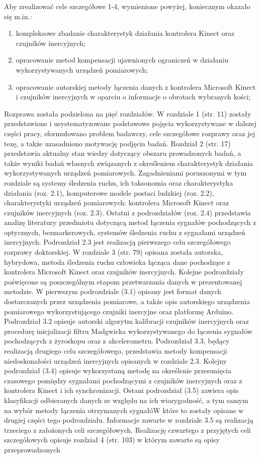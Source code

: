 \documentclass[10pt,a4paper]{article}
\begin{document}
\begin{FlushLeft}
Aby zrealizować cele szczegółowe 1-4, wymienione powyżej, koniecznym okazało się m.in.:
\begin{enumerate}[1. ]
	\item kompleksowe zbadanie charakterystyk działania kontrolera Kinect oraz czujników inercyjnych;
    \item opracowanie metod kompensacji ujawnionych ograniczeń w działaniu wykorzystywanych urządzeń pomiarowych;
	\item opracowanie autorskiej metody łączenia danych z kontrolera Microsoft Kinect i czujników inercyjnych w oparciu o informacje o obrotach wybranych kości;
\end{enumerate}

Rozprawa została podzielona na pięć rozdziałów. W rozdziale 1 (str. 11) zostały przedstawione i usystematyzowane podstawowe pojęcia wykorzystywane w dalszej części pracy, sformułowano problem badawczy, cele szczegółowe rozprawy oraz jej tezę, a także uzasadniono motywację podjęcia badań. Rozdział 2 (str. 17) przedstawia aktualny stan wiedzy dotyczący obszaru prowadzonych badań, a także wyniki badań własnych związanych z określeniem charakterystyk działania wykorzystywanych urządzeń pomiarowych. Zagadnieniami poruszonymi w tym rozdziale są systemy śledzenia ruchu, ich taksonomia oraz charakterystyka działania (roz. 2.1), komputerowe modele postaci ludzkiej (roz. 2.2), charakterystyki urządzeń pomiarowych: kontrolera Microsoft Kinect oraz czujników inercyjnych (roz. 2.3). Ostatni z podrozdziałów (roz. 2.4) przedstawia analizę literatury przedmiotu dotyczącą metod łączenia sygnałów pochodzących z optycznych, bezmarkerowych, systemów śledzenia ruchu z sygnałami urządzeń inercyjnych. Podrozdział 2.3 jest realizacją pierwszego celu szczegółowego rozprawy doktorskiej. W rozdziale 3 (str. 79) opisana została autorska, hybrydowa, metoda śledzenia ruchu człowieka łącząca dane pochodzące z kontrolera Microsoft Kinect oraz czujników inercyjnych. Kolejne podrozdziały poświęcone są poszczególnym etapom przetwarzania danych w prezentowanej metodzie. W pierwszym podrozdziale (3.1) opisany jest format danych dostarczanych przez urządzenia pomiarowe, a także opis autorskiego urządzenia pomiarowego wykorzystującego czujniki inercyjne oraz platformę Arduino. Podrozdział 3.2 opisuje autorski algorytm kalibracji czujników inercyjnych oraz procedurę inicjalizacji filtru Madgwicka wykorzystywanego do łączenia sygnałów pochodzących z żyroskopu oraz z akcelerometru. Podrozdział 3.3, będący realizacją drugiego celu szczegółowego, przedstawia metody kompensacji niedoskonałości urządzeń inercyjnych opisanych w rozdziale 2.3. Kolejny podrozdział (3.4) opisuje wykorzystaną metodę na określenie przesunięcia czasowego pomiędzy sygnałami pochodzącymi z czujników inercyjnych oraz z kontrolera Kinect i ich synchronizacji. Ostani podrozdział (3.5) zawiera opis klasyfikacji odbieranych danych ze względu na ich wiarygodność, a tym samym na wybór metody łączenia otrzymanych sygnałóW które to zostały opisane w drugiej części tego podrozdziału. Informacje zawarte w rozdziale 3.5 są realizacją trzeciego z założonych celi szczegółowych. Realizację czwartego z przyjętych celi szczegółowych opisuje rozdział 4 (str. 103) w którym zawarte są opisy przeprowadzonych 
\end{FlushLeft}
\end{document}
